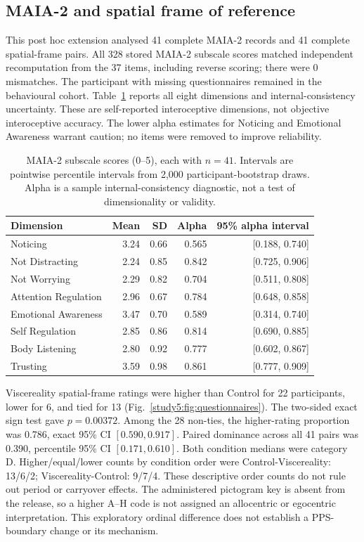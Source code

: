 \subsection{MAIA-2 and spatial frame of reference}

This post hoc extension analysed 41 complete MAIA-2 records and 41 complete spatial-frame pairs. All 328 stored MAIA-2 subscale scores matched independent recomputation from the 37 items, including reverse scoring; there were 0 mismatches. The participant with missing questionnaires remained in the behavioural cohort. Table~\ref{study5:tab:maia} reports all eight dimensions and internal-consistency uncertainty. These are self-reported interoceptive dimensions, not objective interoceptive accuracy. The lower alpha estimates for Noticing and Emotional Awareness warrant caution; no items were removed to improve reliability.

\begin{table}[htbp]
\centering\small
\begin{tabular}{lrrrr}
\hline
Dimension & Mean & SD & Alpha & 95\% alpha interval \\
\hline
Noticing & 3.24 & 0.66 & 0.565 & [0.188, 0.740] \\
Not Distracting & 2.24 & 0.85 & 0.842 & [0.725, 0.906] \\
Not Worrying & 2.29 & 0.82 & 0.704 & [0.511, 0.808] \\
Attention Regulation & 2.96 & 0.67 & 0.784 & [0.648, 0.858] \\
Emotional Awareness & 3.47 & 0.70 & 0.589 & [0.314, 0.740] \\
Self Regulation & 2.85 & 0.86 & 0.814 & [0.690, 0.885] \\
Body Listening & 2.80 & 0.92 & 0.777 & [0.602, 0.867] \\
Trusting & 3.59 & 0.98 & 0.861 & [0.777, 0.909] \\
\hline
\end{tabular}
\caption{MAIA-2 subscale scores (0--5), each with $n=41$. Intervals are pointwise percentile intervals from 2,000 participant-bootstrap draws. Alpha is a sample internal-consistency diagnostic, not a test of dimensionality or validity.}
\label{study5:tab:maia}
\end{table}

Viscereality spatial-frame ratings were higher than Control for 22 participants, lower for 6, and tied for 13 (Fig.~\ref{study5:fig:questionnaires}). The two-sided exact sign test gave $p=0.00372$. Among the 28 non-ties, the higher-rating proportion was 0.786, exact 95\% CI $[0.590, 0.917]$. Paired dominance across all 41 pairs was 0.390, percentile 95\% CI $[0.171, 0.610]$. Both condition medians were category D. Higher/equal/lower counts by condition order were Control-Viscereality: 13/6/2; Viscereality-Control: 9/7/4. These descriptive order counts do not rule out period or carryover effects. The administered pictogram key is absent from the release, so a higher A--H code is not assigned an allocentric or egocentric interpretation. This exploratory ordinal difference does not establish a PPS-boundary change or its mechanism.

